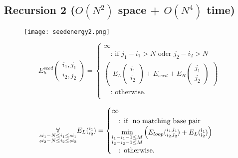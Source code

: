 \clearpage

\subsection{Recursion 2 ($O(N^{2})$ space + $O(N^{4})$ time)}

\begin{figure}[H]
	\centering
	\texttt{[image: seedenergy2.png]}
\end{figure}

\begin{equation*}
E_{h}^{seed}(\substack{i_1,j_1\\i_2,j_2}) = \begin{cases}
\infty\\
\quad\text{: if } j_{1} - i_{1} > N \text{ oder } j_{2} - i_{2} > N\\
\begin{pmatrix}
E_{L}(\substack{i_1\\i_2}) + E_{seed} + E_{R}(\substack{j_1\\j_2})
\end{pmatrix}\\
\quad\text{: otherwise.}\\
\end{cases}
\end{equation*}

\begin{equation*}
\underset{\substack{si_{1}-N \le i_{1} \le si_{1}\\si_{2}-N \le i_{2} \le si_{2}}}{\forall}\\
E_L(\substack{i_1\\i_2}) = \begin{cases}
\infty\\
\quad\text{: if } \text{ no matching base pair }\\
\min\limits_{\substack{l_{1} - i_{1} - 1 \le M\\l_{2} - i_{2} - 1 \le M}}
\begin{pmatrix}
E_{loop}(\substack{i_1,l_1\\i_2,l_2}) + E_L(\substack{l_1\\l_2})
\end{pmatrix}\\
\quad\text{: otherwise.}\\

\end{cases}
\end{equation*}

